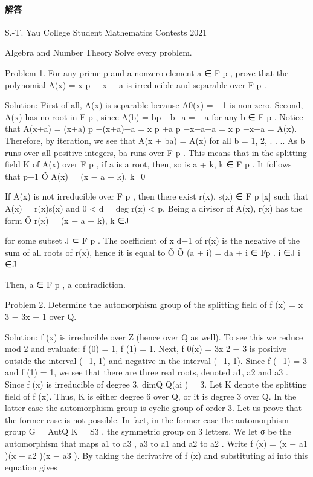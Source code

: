 \documentclass[UTF8,12pt]{ctexart}
\begin{document}
\paragraph{解答}

S.-T. Yau College Student Mathematics Contests 2021

Algebra and Number Theory Solve every problem.

Problem 1. For any prime p and a nonzero element a ∈ F p , prove that the polynomial A(x) = x p − x − a is irreducible and separable over F p .

Solution: First of all, A(x) is separable because A0(x) = −1 is non-zero. Second, A(x) has no root in F p , since A(b) = bp −b−a = −a for any b ∈ F p . Notice that A(x+a) = (x+a) p −(x+a)−a = x p +a p −x−a−a = x p −x−a = A(x). Therefore, by iteration, we see that A(x + ba) = A(x) for all b = 1, 2, . . .. As b runs over all positive integers, ba runs over F p . This means that in the splitting field K of A(x) over F p , if a is a root, then, so is a + k, k ∈ F p . It follows that p−1 Ö A(x) = (x − a − k). k=0

If A(x) is not irreducible over F p , then there exist r(x), s(x) ∈ F p [x] such that A(x) = r(x)s(x) and 0 < d = deg r(x) < p. Being a divisor of A(x), r(x) has the form Ö r(x) = (x − a − k), k ∈J

for some subset J ⊂ F p . The coefficient of x d−1 of r(x) is the negative of the sum of all roots of r(x), hence it is equal to Õ Õ (a + i) = da + i ∈ Fp . i ∈J i ∈J

Then, a ∈ F p , a contradiction.

Problem 2. Determine the automorphism group of the splitting field of f (x) = x 3 − 3x + 1 over Q.

Solution: f (x) is irreducible over Z (hence over Q as well). To see this we reduce mod 2 and evaluate: f (0) = 1, f (1) = 1. Next, f 0(x) = 3x 2 − 3 is positive outside the interval (−1, 1) and negative in the interval (−1, 1). Since f (−1) = 3 and f (1) = 1, we see that there are three real roots, denoted a1, a2 and a3 . Since f (x) is irreducible of degree 3, dimQ Q(ai ) = 3. Let K denote the splitting field of f (x). Thus, K is either degree 6 over Q, or it is degree 3 over Q. In the latter case the automorphism group is cyclic group of order 3. Let us prove that the former case is not possible. In fact, in the former case the automorphism group G = AutQ K = S3 , the symmetric group on 3 letters. We let σ be the automorphism that maps a1 to a3 , a3 to a1 and a2 to a2 . Write f (x) = (x − a1 )(x − a2 )(x − a3 ). By taking the derivative of f (x) and substituting ai into this equation gives
\end{document}

